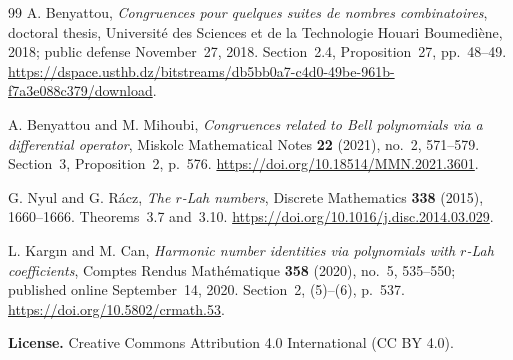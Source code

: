 \documentclass[11pt]{article}
\begin{document}
\begin{thebibliography}{99}
A. Benyattou, \emph{Congruences pour quelques suites de nombres
combinatoires}, doctoral thesis, Universit\'e des Sciences et de la
Technologie Houari Boumedi\`ene, 2018; public defense November~27, 2018.
Section~2.4, Proposition~27, pp.~48--49.
\url{https://dspace.usthb.dz/bitstreams/db5bb0a7-c4d0-49be-961b-f7a3e088c379/download}.

A. Benyattou and M. Mihoubi, \emph{Congruences related to Bell
polynomials via a differential operator}, Miskolc Mathematical Notes
\textbf{22} (2021), no.~2, 571--579. Section~3, Proposition~2, p.~576.
\url{https://doi.org/10.18514/MMN.2021.3601}.

G. Nyul and G. R\'acz, \emph{The $r$-Lah numbers}, Discrete Mathematics
\textbf{338} (2015), 1660--1666. Theorems~3.7 and~3.10.
\url{https://doi.org/10.1016/j.disc.2014.03.029}.

L. Karg{\i}n and M. Can, \emph{Harmonic number identities via polynomials
with $r$-Lah coefficients}, Comptes Rendus Math\'ematique \textbf{358}
(2020), no.~5, 535--550; published online September~14, 2020.
Section~2, (5)--(6), p.~537.
\url{https://doi.org/10.5802/crmath.53}.
\end{thebibliography}

\medskip\noindent
\textbf{License.} Creative Commons Attribution 4.0 International
(CC BY 4.0).
\end{document}
